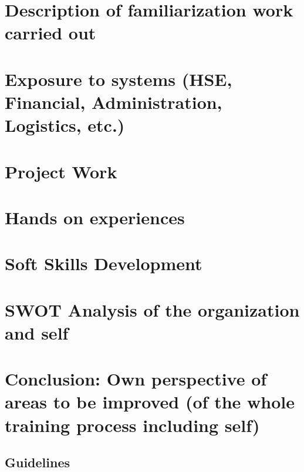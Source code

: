 \documentclass[a4paper,12pt]{report}%
\begin{document}
\chapter{Description of familiarization work carried out}

\chapter{Exposure to systems (HSE, Financial, Administration, Logistics, etc.)}

\chapter{Project Work}

\chapter{Hands on experiences}

\chapter{Soft Skills Development}

\chapter{SWOT Analysis of the organization and self}

\chapter{Conclusion: Own perspective of areas to be improved (of the whole training process including self)}


\begin{appendices}
	\chapter{Guidelines}
\end{appendices}




\end{document}
